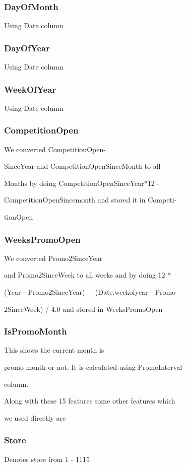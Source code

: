 \documentclass[letterpaper, 10 pt, conference]{ieeeconf}  %
\begin{document}
\subsubsection{\textbf{DayOfMonth}} Using Date column
\subsubsection{\textbf{DayOfYear}} Using Date column
\subsubsection{\textbf{WeekOfYear}} Using Date column


\subsubsection{\textbf{CompetitionOpen}}

We converted CompetitionOpen-

SinceYear and CompetitionOpenSinceMonth to all 

Months by doing CompetitionOpenSinceYear*12 - 

CompetitionOpenSincemonth  and stored it in Competi-

tionOpen

\subsubsection{\textbf{WeeksPromoOpen}}

We converted Promo2SinceYear 

and Promo2SinceWeek to all weeks and by doing 12 * 

(Year - Promo2SinceYear) + (Date.weekofyear -
Promo

2SinceWeek) / 4.0 and stored in WeeksPromoOpen


\subsubsection{\textbf{IsPromoMonth}}

This shows the current month is 

promo month or not. It is calculated using PromoInterval


column. 

Along with these 15 features some other features which 

we used directly are
\subsubsection{\textbf{Store}} Denotes store from 1 - 1115
\end{document}
